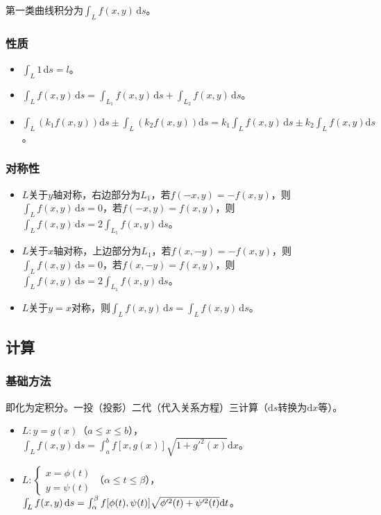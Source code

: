 \documentclass[UTF8, 12pt]{ctexart}
\begin{document}
第一类曲线积分为$\int_Lf(x,y)\,\textrm{d}s$。

\subsubsection{性质}

\begin{itemize}
    \item $\int_L1\,\textrm{d}s=l$。
    \item $\int_Lf(x,y)\,\textrm{d}s=\int_{L_1}f(x,y)\,\textrm{d}s+\int_{L_2}f(x,y)\,\textrm{d}s$。
    \item $\int_L(k_1f(x,y))\textrm{d}s\pm\int_L(k_2f(x,y))\textrm{d}s=k_1\int_Lf(x,y)\,\textrm{d}s\pm k_2\int_Lf(x,y)\textrm{d}s$。
\end{itemize}

\subsubsection{对称性}

\begin{itemize}
    \item $L$关于$y$轴对称，右边部分为$L_1$，若$f(-x,y)=-f(x,y)$，则$\int_Lf(x,y)\,\textrm{d}s=0$，若$f(-x,y)=f(x,y)$，则$\int_Lf(x,y)\,\textrm{d}s=2\int_{L_1}f(x,y)\,\textrm{d}s$。
    \item $L$关于$x$轴对称，上边部分为$L_1$，若$f(x,-y)=-f(x,y)$，则$\int_Lf(x,y)\,\textrm{d}s=0$，若$f(x,-y)=f(x,y)$，则$\int_Lf(x,y)\,\textrm{d}s=2\int_{L_1}f(x,y)\,\textrm{d}s$。
    \item $L$关于$y=x$对称，则$\int_Lf(x,y)\,\textrm{d}s=\int_Lf(x,y)\,\textrm{d}s$。
\end{itemize}

\subsection{计算}

\subsubsection{基础方法}

即化为定积分。一投（投影）二代（代入关系方程）三计算（$\textrm{d}s$转换为$\textrm{d}x$等）。

\begin{itemize}
    \item $L:y=g(x)$（$a\leqslant x\leqslant b$），$\int_Lf(x,y)\,\textrm{d}s=\int_a^bf[x,g(x)]\sqrt{1+g'^2(x)}\textrm{d}x$。
    \item $L:\left\{\begin{array}{c}
        x=\phi(t) \\
        y=\psi(t)
    \end{array}\right.$（$\alpha\leqslant t\leqslant\beta$），$\int_Lf(x,y)\,\textrm{d}s=\int_\alpha^\beta f[\phi(t),\psi(t)]\\\sqrt{\phi'^2(t)+\psi'^2(t)}\textrm{d}t$。
\end{itemize}
\end{document}
